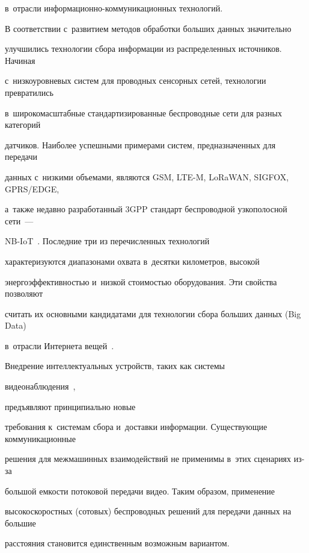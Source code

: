 в~отрасли ин\-фор\-ма\-ци\-он\-но-ком\-му\-ни\-ка\-ци\-он\-ных технологий.





В соответствии с~развитием методов обработки больших данных значительно 


улучшились технологии сбора информации из распределенных источников. Начиная 


с~низкоуровневых систем для проводных сенсорных сетей, технологии превратились 


в~широкомасштабные стандартизированные беспроводные сети для разных категорий 


датчиков. Наиболее успешными примерами систем, предназначенных для передачи 


данных с~низкими объемами, являются GSM, LTE-M, LoRaWAN, SIGFOX, GPRS\!/\!EDGE, 


а~также недавно разработанный 3GPP стандарт беспроводной узкополосной сети~--- 


NB-IoT~\cite{our_iot_journal}. Последние три из перечисленных технологий 


характеризуются диапазонами охвата в~десятки километров, высокой 


энергоэффективностью и~низкой стоимостью оборудования. Эти свойства позволяют 


считать их основными кандидатами для технологии сбора больших данных (Big Data) 


в~отрасли Интернета вещей~\cite{lora_sigfox,M2M_paper_dohler,nb_iot_magazine}.





Внедрение интеллектуальных устройств, таких как системы 


видеонаблюдения~\cite{multimedia_big_data,video_surveilance1}, 


предъявляют принципиально новые 


требования к~системам сбора и~доставки информации. Существующие коммуникационные 


решения для межмашинных взаимодействий не применимы в~этих сценариях из-за 


большой емкости потоковой передачи видео. Таким образом, применение 


высокоскоростных (сотовых) беспроводных решений для передачи данных на большие 


расстояния становится единственным возможным вариантом.





